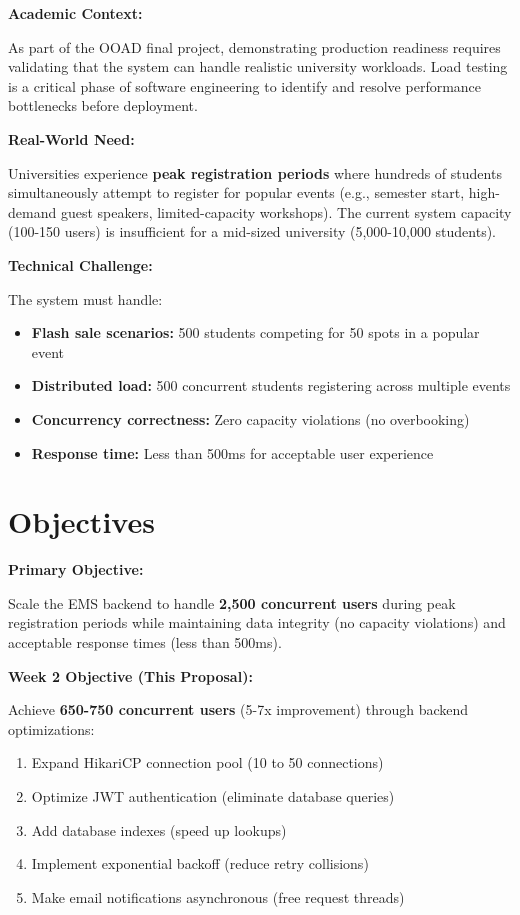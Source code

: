 \documentclass[12pt,a4paper,oneside]{report}
\begin{document}
\textbf{Academic Context:}

As part of the OOAD final project, demonstrating production readiness requires validating that the system can handle realistic university workloads. Load testing is a critical phase of software engineering to identify and resolve performance bottlenecks before deployment.

\vspace{0.5em}
\textbf{Real-World Need:}

Universities experience \textbf{peak registration periods} where hundreds of students simultaneously attempt to register for popular events (e.g., semester start, high-demand guest speakers, limited-capacity workshops). The current system capacity (100-150 users) is insufficient for a mid-sized university (5,000-10,000 students).

\vspace{0.5em}
\textbf{Technical Challenge:}

The system must handle:
\begin{itemize}[leftmargin=1.5em,topsep=0.3em,itemsep=0.2em]
    \item \textbf{Flash sale scenarios:} 500 students competing for 50 spots in a popular event
    \item \textbf{Distributed load:} 500 concurrent students registering across multiple events
    \item \textbf{Concurrency correctness:} Zero capacity violations (no overbooking)
    \item \textbf{Response time:} Less than 500ms for acceptable user experience
\end{itemize}

\section{Objectives}

\textbf{Primary Objective:}

Scale the EMS backend to handle \textbf{2,500 concurrent users} during peak registration periods while maintaining data integrity (no capacity violations) and acceptable response times (less than 500ms).

\vspace{0.5em}
\textbf{Week 2 Objective (This Proposal):}

Achieve \textbf{650-750 concurrent users} (5-7x improvement) through backend optimizations:

\begin{enumerate}[leftmargin=1.5em,topsep=0.3em,itemsep=0.2em]
    \item Expand HikariCP connection pool (10 to 50 connections)
    \item Optimize JWT authentication (eliminate database queries)
    \item Add database indexes (speed up lookups)
    \item Implement exponential backoff (reduce retry collisions)
    \item Make email notifications asynchronous (free request threads)
\end{enumerate}
\end{document}
